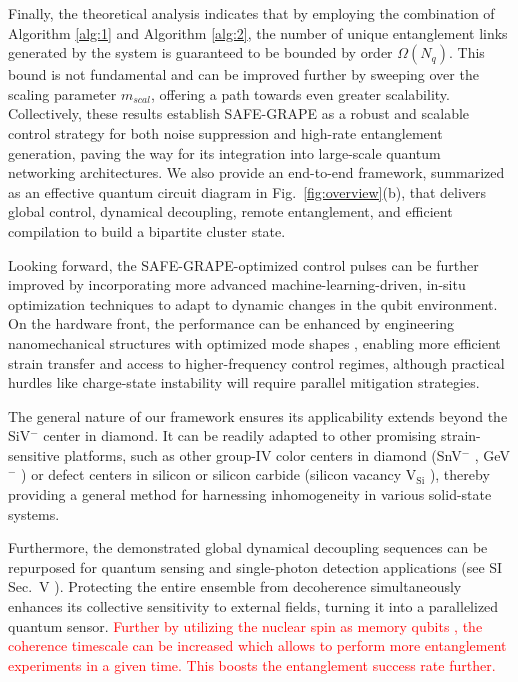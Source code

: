\documentclass[%
 reprint,
 superscriptaddress,
 amsmath,amssymb,
 aps,
 prx,
]{revtex4-2}
\newcommand{\rev}[1]{\textcolor{red}{#1}}
\begin{document}
Finally, the theoretical analysis indicates that by employing the combination of Algorithm \ref{alg:1} and Algorithm \ref{alg:2}, the number of unique entanglement links generated by the system is guaranteed to be bounded by order $\Omega(N_q)$. This bound is not fundamental and can be improved further by sweeping over the scaling parameter $m_{scal}$, offering a path towards even greater scalability. Collectively, these results establish SAFE-GRAPE as a robust and scalable control strategy for both noise suppression and high-rate entanglement generation, paving the way for its integration into large-scale quantum networking architectures. We also provide an end-to-end framework, summarized as an effective quantum circuit diagram in Fig.~\ref{fig:overview}(b), that delivers global control, dynamical decoupling, remote entanglement, and efficient compilation to build a bipartite cluster state.

Looking forward, the SAFE-GRAPE-optimized control pulses can be further improved by incorporating more advanced machine-learning-driven, in-situ optimization techniques to adapt to dynamic changes in the qubit environment. On the hardware front, the performance can be enhanced by engineering nanomechanical structures with optimized mode shapes \cite{raniwala2025spin}, enabling more efficient strain transfer and access to higher-frequency control regimes, although practical hurdles like charge-state instability will require parallel mitigation strategies.

The general nature of our framework ensures its applicability extends beyond the SiV$^{-}$ center in diamond. It can be readily adapted to other promising strain-sensitive platforms, such as other group-IV color centers in diamond (SnV$^{-}$ \cite{iwasaki2017tin,parker2024diamond,rugar2021quantum}, GeV$^{-}$ \cite{iwasaki2015germanium}) or defect centers in silicon \cite{prabhu_individually_2023, saggio_cavity-enhanced_2024, dhaliah2022first, buzzi2025spectral, PRXQuantum.5.010102, PRXQuantum.4.020308} or silicon carbide (silicon vacancy V$_{\text{Si}}$ \cite{sorman2000silicon}), thereby providing a general method for harnessing inhomogeneity in various solid-state systems.

Furthermore, the demonstrated global dynamical decoupling sequences can be repurposed for quantum sensing \cite{PhysRevLett.134.120802,ulanowski2025cavity} and single-photon detection applications \cite{https://doi.org/10.48550/arxiv.2401.10455} (see SI Sec.~V \cite{googleSI_Programmable_Quantum_Matter_2025Google}). Protecting the entire ensemble from decoherence simultaneously enhances its collective sensitivity to external fields, turning it into a parallelized quantum sensor. \rev{Further by utilizing the nuclear spin as memory qubits \cite{bhaskar_experimental_2020}, the coherence timescale can be increased which allows to perform more entanglement experiments in a given time. This boosts the entanglement success rate further.} 
\end{document}
